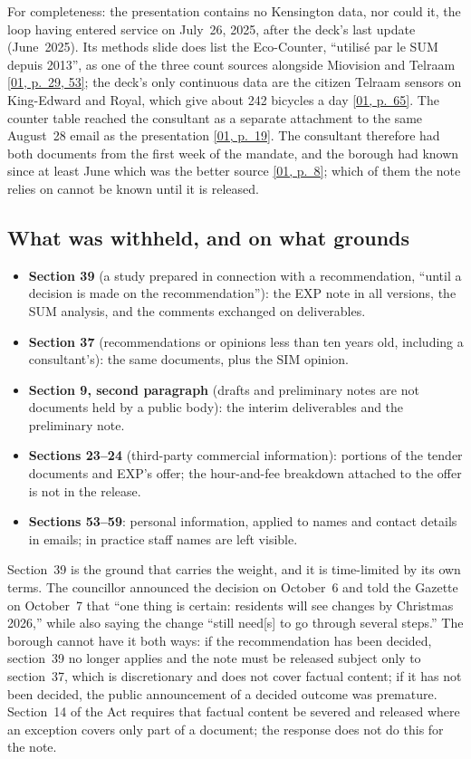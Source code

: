\documentclass[11pt,letterpaper]{article}
\newcommand{\pagesurl}{https://openmobilitydata.github.io/Terrebonne-access-requests}
\newcommand{\pgl}[3]{\href{\pagesurl/\csname bundle#1\endcsname\#page=#2}{\textsf{\small[#1, p.~#3]}}}
\newcommand{\pg}[2]{\pgl{#1}{#2}{#2}}
\begin{document}
For completeness: the presentation contains no Kensington data, nor could
it, the loop having entered service on July~26, 2025, after the deck's last
update (June~2025). Its methods slide does list the Eco-Counter, ``utilis\'e
par le SUM depuis 2013'', as one of the three count sources alongside
Miovision and Telraam \pgl{01}{53}{29, 53}; the deck's only continuous data
are the citizen Telraam sensors on King-Edward and Royal, which give about
242 bicycles a day \pg{01}{65}. The counter table reached the consultant
as a separate attachment to the same August~28 email as the presentation
\pg{01}{19}. The consultant therefore had both documents from the first
week of the mandate, and the borough had known since at least June which
was the better source \pg{01}{8}; which of them the note relies on cannot
be known until it is released.

\subsection{What was withheld, and on what grounds}

\begin{itemize}[nosep]
  \item \textbf{Section 39} (a study prepared in connection with a
    recommendation, ``until a decision is made on the recommendation''):
    the EXP note in all versions, the SUM analysis, and the comments
    exchanged on deliverables.
  \item \textbf{Section 37} (recommendations or opinions less than ten years
    old, including a consultant's): the same documents, plus the SIM
    opinion.
  \item \textbf{Section 9, second paragraph} (drafts and preliminary notes
    are not documents held by a public body): the interim deliverables and
    the preliminary note.
  \item \textbf{Sections 23--24} (third-party commercial information):
    portions of the tender documents and EXP's offer; the hour-and-fee
    breakdown attached to the offer is not in the release.
  \item \textbf{Sections 53--59}: personal information, applied to names
    and contact details in emails; in practice staff names are left
    visible.
\end{itemize}

Section~39 is the ground that carries the weight, and it is time-limited by
its own terms. The councillor announced the decision on October~6 and told
the Gazette on October~7 that ``one thing is certain: residents will see
changes by Christmas 2026,'' while also saying the change ``still need[s]
to go through several steps.'' The borough cannot have it both ways: if the
recommendation has been decided, section~39 no longer applies and the note
must be released subject only to section~37, which is discretionary and
does not cover factual content; if it has not been decided, the public
announcement of a decided outcome was premature. Section~14 of the Act
requires that factual content be severed and released where an exception
covers only part of a document; the response does not do this for the note.
\end{document}
